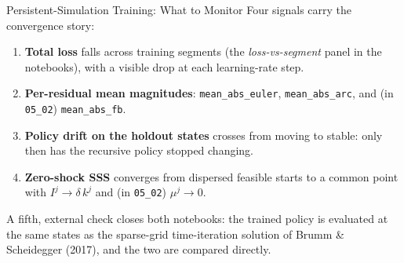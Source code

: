 \documentclass[aspectratio=169,11pt]{beamer}
\newcommand{\emphc}[1]{\textcolor{harvardcrimson}{#1}}
\begin{document}
\begin{frame}{Persistent-Simulation Training: What to Monitor}
Four signals carry the convergence story:

\vspace{0.3em}
\begin{enumerate}\itemsep3pt
    \item \textbf{Total loss} falls across training segments (the \emph{loss-vs-segment} panel in the notebooks), with a visible drop at each learning-rate step.
    \item \textbf{Per-residual mean magnitudes}: \texttt{mean\_abs\_euler}, \texttt{mean\_abs\_arc}, and (in \texttt{05\_02}) \texttt{mean\_abs\_fb}.
    \item \textbf{Policy drift on the holdout states} crosses from \emphc{moving} to \emphc{stable}: only then has the recursive policy stopped changing.
    \item \textbf{Zero-shock SSS} converges from dispersed feasible starts to a common point with $I^j \to \delta\,k^j$ and (in \texttt{05\_02}) $\mu^j \to 0$.
\end{enumerate}

\vspace{0.4em}
{\footnotesize A fifth, external check closes both notebooks: the trained policy is evaluated at the same states as the sparse-grid time-iteration solution of Brumm \& Scheidegger (2017), and the two are compared directly.}
\end{frame}
\end{document}
